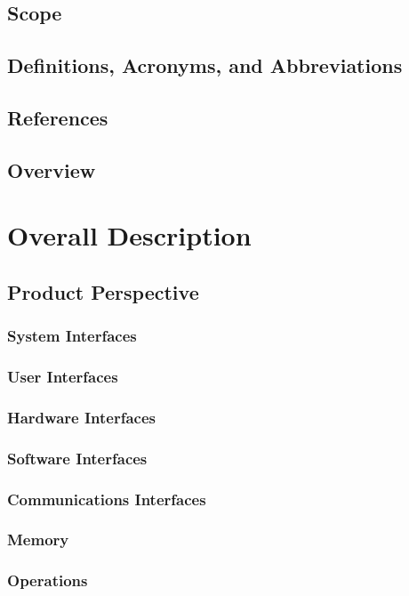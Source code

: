 \documentclass[12pt]{article}
\begin{document}
	\subsection{Scope}
		
	\subsection{Definitions, Acronyms, and Abbreviations}
	\subsection{References}
	\subsection{Overview}
	
	\section{Overall Description}
	\subsection{Product Perspective}
	\subsubsection{System Interfaces}
	\subsubsection{User Interfaces}
	\subsubsection{Hardware Interfaces}
	
	\subsubsection{Software Interfaces}
	\subsubsection{Communications Interfaces}
	\subsubsection{Memory}
	\subsubsection{Operations}
	
\end{document}

